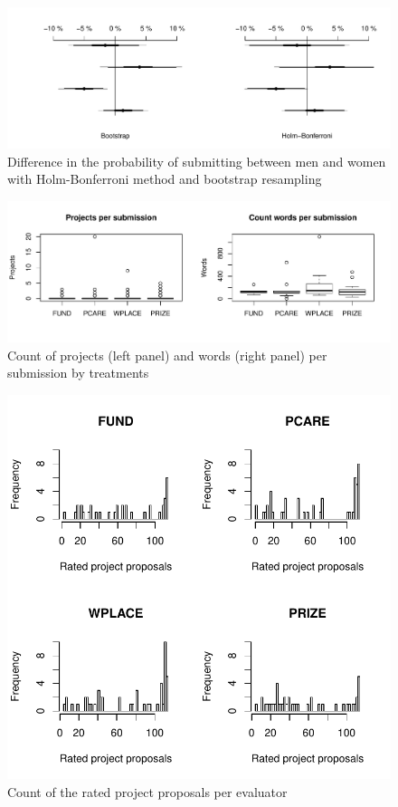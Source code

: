 \documentclass[12pt, titlepage]{article}
\begin{document}
\begin{figure} 
  \centering
  \caption{Difference in the probability of submitting between men and women with Holm-Bonferroni method and bootstrap resampling}
  \label{fig: gender robust}
  \includegraphics{Figures/gender-robust-1.pdf}
\end{figure}

\begin{figure} 
  \centering
  \caption{Count of projects (left panel) and words (right panel) per submission by treatments}
  \label{fig: counts}
  \includegraphics{Figures/counts-1.pdf}
\end{figure}

\begin{figure}
\centering
\caption{Count of the rated project proposals per evaluator}
\label{app: rating counts}
\includegraphics{Figures/plot-ratings-appendix-1.pdf}
\end{figure}
\end{document}

